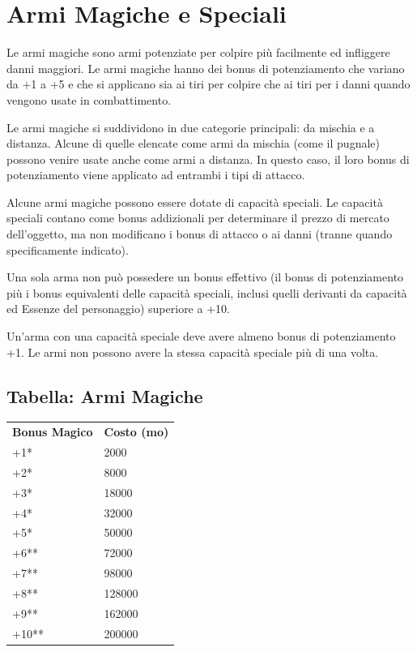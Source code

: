 \documentclass[a4paper,11pt,twoside,openany]{book}
\begin{document}
\pagebreak

\section{Armi Magiche e Speciali}

\label{armi-magiche-e-speciali}

Le armi magiche sono armi potenziate per colpire più facilmente ed infliggere danni maggiori. Le armi magiche hanno dei bonus di potenziamento che variano da +1 a +5 e che si applicano sia ai tiri per colpire che ai tiri per i danni quando vengono usate in combattimento. 

Le armi magiche si suddividono in due categorie principali: da mischia e a distanza. Alcune di quelle elencate come armi da mischia (come il pugnale) possono venire usate anche come armi a distanza. In questo caso, il loro bonus di potenziamento viene applicato ad entrambi i tipi di attacco.

Alcune armi magiche possono essere dotate di capacità speciali. Le capacità speciali contano come bonus addizionali per determinare il prezzo di mercato dell'oggetto, ma non modificano i bonus di attacco o ai danni (tranne quando specificamente indicato).

Una sola arma non può possedere un bonus effettivo (il bonus di potenziamento più i bonus equivalenti delle capacità speciali, inclusi quelli derivanti da capacità ed Essenze del personaggio) superiore a +10.

Un'arma con una capacità speciale deve avere almeno bonus di potenziamento +1. Le armi non possono avere la stessa capacità speciale più di una volta.



\subsection{Tabella: Armi Magiche}

\label{tabella-armi-magiche}

\begin{tabular}{ll}
	\toprule
	\textbf{Bonus Magico} & \textbf{Costo (mo)}\\
	+1{*} & 2000\\
	+2{*} & 8000\\
	+3{*} & 18000\\
	+4{*} & 32000\\
	+5{*} & 50000\\
	+6{*}{*}              & 72000\\
	+7{*}{*}              & 98000\\
	+8{*}{*}              & 128000\\
	+9{*}{*}              & 162000\\
	+10{*}{*}             & 200000\\
\end{tabular}
\end{document}

